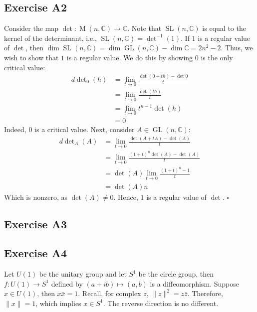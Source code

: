 \documentclass{article}
\newcommand{\C}{\mathbb{C}}
\DeclareMathOperator{\M}{M}
\DeclareMathOperator{\GL}{GL}
\DeclareMathOperator{\SL}{SL}
\begin{document}
\subsection*{Exercise A2}
  Consider the map $\det\colon\M(n,\C)\to\C$. Note that $\SL(n,\C)$ is equal to
  the kernel of the determinant, i.e., $\SL(n,\C)=\det^{-1}(1)$. If $1$ is a
  regular value of $\det$, then $\dim\SL(n,\C)=\dim\GL(n,\C)-\dim\C=2n^2-2$.
  Thus, we wish to show that $1$ is a regular value. We do this by showing $0$
  is the only critical value:
  \begin{align*}
    d\det\nolimits_0(h) &= \lim_{t\to0}\frac{\det(0+th)-\det0}{t}\\
                        &= \lim_{t\to0}\frac{\det(th)}{t}\\
                        &= \lim_{t\to0}t^{n-1}\det(h)\\
                        &= 0
  \end{align*}
  Indeed, $0$ is a critical value. Next, consider $A\in\GL(n,\C)$:
  \begin{align*}
    d\det\nolimits_A(A) &= \lim_{t\to 0}\frac{\det(A+tA)-\det(A)}{t}\\
                        &= \lim_{t\to 0}\frac{(1+t)^n\det(A)-\det(A)}{t}\\
                        &= \det(A)\lim_{t\to 0}\frac{(1+t)^n-1}{t}\\
                        &= \det(A)n
  \end{align*}
  Which is nonzero, as $\det(A)\ne0$. Hence, $1$ is a regular value of $\det$.
  \hfill $\square$

\subsection*{Exercise A3}

\subsection*{Exercise A4}
  Let $U(1)$ be the unitary group and let $S^1$ be the circle group, then $f
  \colon U(1)\to S^1$ defined by $(a+ib)\mapsto (a,b)$ is a diffeomorphism.
  Suppose $x\in U(1)$, then $x\bar{x}=1$. Recall, for complex $z$, $\|z\|^2=z
  \bar{z}$. Therefore, $\|x\| = 1$, which implies $x\in S^1$. The reverse
  direction is no different.
\end{document}
